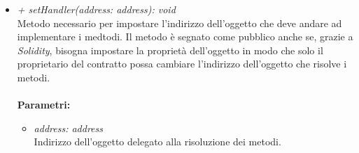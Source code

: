 \begin{itemize}
\begin{itemize}
\begin{itemize}
		\end{itemize}
		\item \textit{+ setHandler(address: address): void}\\
		Metodo necessario per impostare l'indirizzo dell'oggetto che deve andare ad implementare i medtodi. Il metodo è segnato come pubblico anche se, grazie a \textit{Solidity}, bisogna impostare la proprietà dell'oggetto in modo che solo il proprietario del contratto possa cambiare l'indirizzo dell'oggetto che risolve i metodi.\\\\
		\textbf{Parametri:}
		\begin{itemize}
			\item \textit{address: address}\\
			Indirizzo dell'oggetto delegato alla risoluzione dei metodi.
		\end{itemize}		
	\end{itemize}
\end{itemize}

